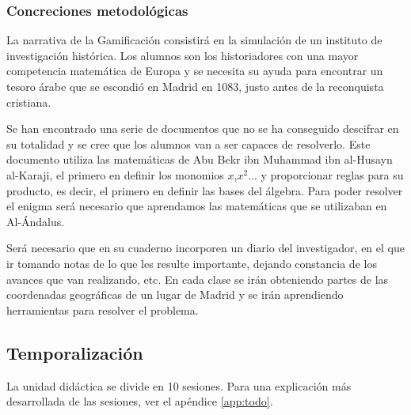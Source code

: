 \subsubsection{Concreciones metodológicas}

La narrativa de la Gamificación consistirá en la simulación de un instituto de investigación histórica.
%
Los alumnos son los historiadores con una mayor competencia matemática de Europa y se necesita su ayuda para encontrar un tesoro árabe que se escondió en Madrid en 1083, justo antes de la reconquista cristiana.

Se han encontrado una serie de documentos que no se ha conseguido descifrar en su totalidad y se cree que los alumnos van a ser capaces de resolverlo.
%
%
Este documento utiliza las matemáticas de Abu Bekr ibn Muhammad ibn al-Husayn al-Karaji, el primero en definir los monomios $x$,$x^2$... y proporcionar reglas para su producto, es decir, el primero en definir las bases del álgebra\citep{MatArabe}.
%
Para poder resolver el enigma será necesario que aprendamos las matemáticas que se utilizaban en Al-Ándalus.

Será necesario que en su cuaderno incorporen un diario del investigador, en el que ir tomando notas de lo que les resulte importante, dejando constancia de los avances que van realizando, etc.
%
En cada clase se irán obteniendo partes de las coordenadas geográficas de un lugar de Madrid y se irán aprendiendo herramientas para resolver el problema.




\subsection{Temporalización}

La unidad didáctica se divide en 10 sesiones.
%
Para una explicación más desarrollada de las sesiones, ver el apéndice \ref{app:todo}.


